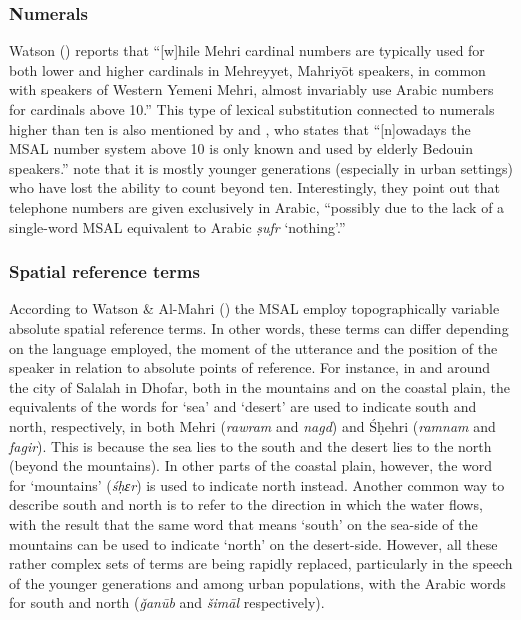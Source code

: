 \documentclass[output=paper]{langsci/langscibook}
\begin{document}
 \subsubsection{Numerals}

Watson (\citeyear[3]{Watson2012}) reports that ``[w]hile  Mehri cardinal numbers  are  typically  used  for  both  lower  and  higher  cardinals  in  Mehreyyet, Mahriyōt  speakers,  in  common  with  speakers  of  Western  Yemeni  Mehri, almost invariably use Arabic numbers for cardinals above 10.'' This type of lexical substitution connected to numerals higher than ten is also mentioned by \citet{Lonnet2011} and \citet[1088]{Simeone-Senelle2011}, who states that ``[n]owadays the MSAL number system above 10 is only known and used by elderly Bedouin speakers.'' \citet[90]{WatsonAl-Mahri2017} note that it is mostly younger generations (especially in urban settings) who have lost the ability to count beyond ten. Interestingly, they point out that telephone numbers are given exclusively in Arabic, “possibly due to the lack of a single-word MSAL equivalent to Arabic \textit{ṣufr} ‘nothing’.”


 \subsubsection{Spatial reference terms}

According to Watson \& Al-Mahri (\citeyear[91]{WatsonAl-Mahri2017}) the MSAL employ topographically variable absolute spatial reference terms. In other words, these terms can differ depending on the language employed, the moment of the utterance and the position of the speaker in relation to absolute points of reference. For instance, in and around the city of Salalah in Dhofar, both in the mountains and on the coastal plain, the equivalents of the words for ‘sea’ and ‘desert’ are used to indicate south and north, respectively, in both Mehri (\textit{rawram} and \textit{nagd}) and Śḥehri (\textit{ramnam} and \textit{fagir}). This is because the sea lies to the south and the desert lies to the north (beyond the mountains). In other parts of the coastal plain, however, the word for ‘mountains’ (\textit{śḥɛr}) is used to indicate north instead. Another common way to describe south and north is to refer to the direction in which the water flows, with the result that the same word that means ‘south’ on the sea-side of the mountains can be used to indicate ‘north’ on the desert-side. However, all these rather complex sets of terms are being rapidly replaced, particularly in the speech of the younger generations and among urban populations, with the Arabic words for south and north (\textit{ǧanūb} and \textit{šimāl} respectively).
\end{document}

